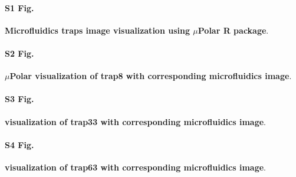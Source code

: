 \documentclass[conference]{IEEEtran}
\begin{document}
\paragraph*{S1 Fig.}
\label{S1_Fig}
{\bf  Microfluidics traps image visualization using $\mu$Polar R package}. 


\paragraph*{S2 Fig.}
\label{S2_Fig}
{\bf  $\mu$Polar visualization of trap8 with corresponding microfluidics image}. 


\paragraph*{S3 Fig.}
\label{S3_Fig}
{\bf  visualization of trap33 with corresponding microfluidics image}. 



\paragraph*{S4 Fig.}
\label{S4_Fig}
{\bf visualization of trap63 with corresponding microfluidics image}. 




\end{document}
